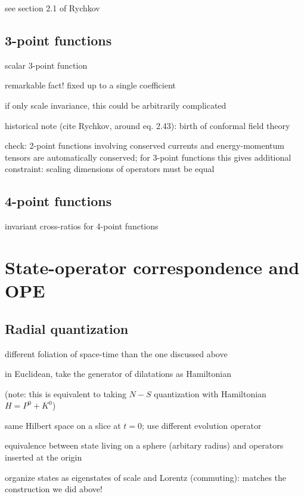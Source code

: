 \documentclass[a4paper,12pt]{article}
\numberwithin{equation}{section}
\begin{document}
see section 2.1 of Rychkov

\subsection{3-point functions}

scalar 3-point function

remarkable fact! fixed up to a single coefficient

if only scale invariance, this could be arbitrarily complicated

historical note (cite Rychkov, around eq. 2.43): birth of conformal field theory


check: 2-point functions involving conserved currents and energy-momentum tensors are automatically conserved; for 3-point functions this gives additional constraint: scaling dimensions of operators must be equal



\subsection{4-point functions}

invariant cross-ratios for 4-point functions


\section{State-operator correspondence and OPE}


\subsection{Radial quantization}

different foliation of space-time than the one discussed above

in Euclidean, take the generator of dilatations as Hamiltonian


(note: this is equivalent to taking $N-S$ quantization with Hamiltonian $H = P^0 + K^0$)

same Hilbert space on a slice at $t = 0$; use different evolution operator


equivalence between state living on a sphere (arbitary radius) and operators inserted at the origin

organize states as eigenstates of scale and Lorentz (commuting): matches the construction we did above!
\end{document}
